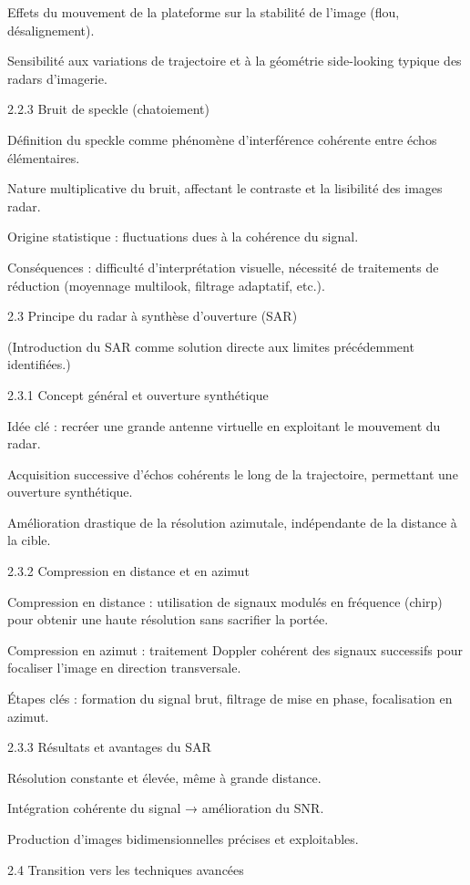 Effets du mouvement de la plateforme sur la stabilité de l’image (flou, désalignement).

Sensibilité aux variations de trajectoire et à la géométrie side-looking typique des radars d’imagerie.

2.2.3 Bruit de speckle (chatoiement)

Définition du speckle comme phénomène d’interférence cohérente entre échos élémentaires.

Nature multiplicative du bruit, affectant le contraste et la lisibilité des images radar.

Origine statistique : fluctuations dues à la cohérence du signal.

Conséquences : difficulté d’interprétation visuelle, nécessité de traitements de réduction (moyennage multilook, filtrage adaptatif, etc.).

2.3 Principe du radar à synthèse d’ouverture (SAR)

(Introduction du SAR comme solution directe aux limites précédemment identifiées.)

2.3.1 Concept général et ouverture synthétique

Idée clé : recréer une grande antenne virtuelle en exploitant le mouvement du radar.

Acquisition successive d’échos cohérents le long de la trajectoire, permettant une ouverture synthétique.

Amélioration drastique de la résolution azimutale, indépendante de la distance à la cible.

2.3.2 Compression en distance et en azimut

Compression en distance : utilisation de signaux modulés en fréquence (chirp) pour obtenir une haute résolution sans sacrifier la portée.

Compression en azimut : traitement Doppler cohérent des signaux successifs pour focaliser l’image en direction transversale.

Étapes clés : formation du signal brut, filtrage de mise en phase, focalisation en azimut.

2.3.3 Résultats et avantages du SAR

Résolution constante et élevée, même à grande distance.

Intégration cohérente du signal → amélioration du SNR.

Production d’images bidimensionnelles précises et exploitables.

2.4 Transition vers les techniques avancées

